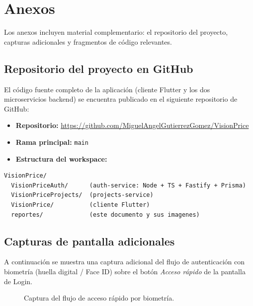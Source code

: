 \documentclass[12pt, a4paper]{article} %
\begin{document}
\clearpage %

\section{Anexos}
\label{sec:anexos}
Los anexos incluyen material complementario: el repositorio del
proyecto, capturas adicionales y fragmentos de código relevantes.

\subsection{Repositorio del proyecto en GitHub}
\label{sec:repo}
El código fuente completo de la aplicación (cliente Flutter y los dos
microservicios backend) se encuentra publicado en el siguiente
repositorio de GitHub:

\begin{itemize}
    \item \textbf{Repositorio:} \url{https://github.com/MiguelAngelGutierrezGomez/VisionPrice}
    \item \textbf{Rama principal:} \texttt{main}
    \item \textbf{Estructura del workspace:}
\end{itemize}

\begin{lstlisting}[language={}, caption={Layout del workspace en el repositorio}]
VisionPrice/
  VisionPriceAuth/      (auth-service: Node + TS + Fastify + Prisma)
  VisionPriceProjects/  (projects-service)
  VisionPrice/          (cliente Flutter)
  reportes/             (este documento y sus imagenes)
\end{lstlisting}

\subsection{Capturas de pantalla adicionales}
A continuación se muestra una captura adicional del flujo de
autenticación con biometría (huella digital / Face ID) sobre el botón
\textit{Acceso rápido} de la pantalla de Login.

\begin{figure}[h]
    \centering
    \caption{Captura del flujo de acceso rápido por biometría.}
    \label{fig:biometric}
\end{figure}

\clearpage
\end{document}
